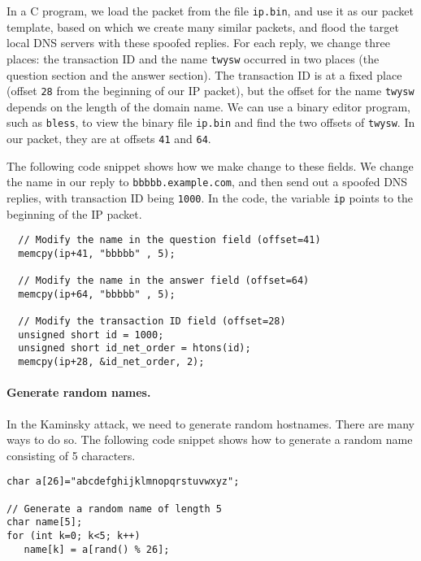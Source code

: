 In a C program, we load the packet from the file \texttt{ip.bin}, and use
it as our packet template, based on which we create many similar packets,
and flood the target local DNS servers with these spoofed replies. For each
reply, we change three places: the transaction ID and the name
\texttt{twysw} occurred in two places (the question section and the answer
section).  The transaction ID is at a fixed place (offset  \texttt{28} from
the beginning of our IP packet), but the offset for the name \texttt{twysw}
depends on the length of the domain name. We can use a binary editor
program, such as \texttt{bless}, to view the binary file \texttt{ip.bin}
and find the two offsets of \texttt{twysw}. In our packet, they are at
offsets \texttt{41} and \texttt{64}.


The following code snippet shows how we make change to these fields. We change
the name in our reply to \texttt{bbbbb.example.com}, and then send out a
spoofed DNS replies, with transaction ID being \texttt{1000}.
In the code, the variable \texttt{ip} points to the beginning of the IP packet.  

\begin{lstlisting}
  // Modify the name in the question field (offset=41)
  memcpy(ip+41, "bbbbb" , 5);

  // Modify the name in the answer field (offset=64)
  memcpy(ip+64, "bbbbb" , 5);

  // Modify the transaction ID field (offset=28)
  unsigned short id = 1000;
  unsigned short id_net_order = htons(id);
  memcpy(ip+28, &id_net_order, 2);
\end{lstlisting}



\paragraph{Generate random names.} In the Kaminsky attack, we need to 
generate random hostnames. There are many ways to do so. The following 
code snippet shows how to generate a random name consisting of 
5 characters. 

\begin{lstlisting}
char a[26]="abcdefghijklmnopqrstuvwxyz";

// Generate a random name of length 5
char name[5];
for (int k=0; k<5; k++)  
   name[k] = a[rand() % 26];
\end{lstlisting}
 




